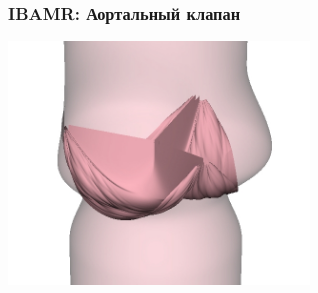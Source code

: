 \documentclass[14pt]{beamer}
\begin{document}
\begin{frame}
\frametitle{IBAMR: Аортальный клапан}
    \begin{center}
	\includegraphics[width=8cm]{immersed_boundary/valve_vessel_side_crop.jpg}
    \end{center}
\end{frame}
\end{document}
